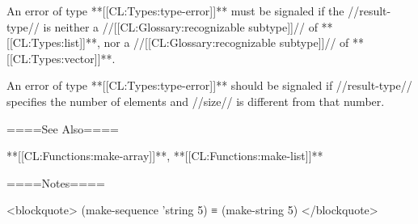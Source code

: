 An error of type **[[CL:Types:type-error]]** must be signaled if the //result-type// is neither a //[[CL:Glossary:recognizable subtype]]// of **[[CL:Types:list]]**, nor a //[[CL:Glossary:recognizable subtype]]// of **[[CL:Types:vector]]**.

An error of type **[[CL:Types:type-error]]** should be signaled if //result-type// specifies the number of elements and //size// is different from that number.

====See Also====

**[[CL:Functions:make-array]]**, **[[CL:Functions:make-list]]**

====Notes====

<blockquote> (make-sequence 'string 5) ≡ (make-string 5) </blockquote>

       
